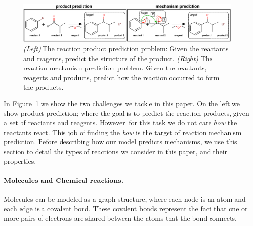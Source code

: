 

\begin{figure}[t!]
\centering
\includegraphics[width=\textwidth]{reaction_diagram}
\caption{\emph{(Left)} The reaction product prediction problem: Given the reactants and reagents, predict the structure of the product. \emph{(Right)} The reaction mechanism prediction problem: Given the reactants, reagents and products, predict how the reaction occurred to form the products.}
\label{fig:task-overview}
\end{figure}


In Figure~\ref{fig:task-overview} we show the two challenges we tackle in this paper. 
On the left we show product prediction; where the goal is to predict the reaction products, given a set of reactants and reagents. However, for this task we do not care {\em how} the reactants react.
 This job of finding the {\em how} is the target of reaction mechanism prediction. 
 Before describing how our model predicts mechanisms, we use this section to detail the types of reactions we consider in this paper, and their properties.



\vspace{-0.15cm}
\paragraph{Molecules and Chemical reactions.}


Molecules can be modeled as a graph structure, where each node is an atom and each edge is a covalent bond.
These covalent bonds represent the fact that 
one or more pairs of electrons are shared between the atoms that the bond connects. 


